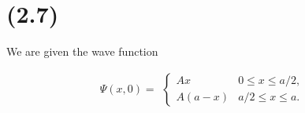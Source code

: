 \section{(2.7)}

We are given the wave function

\begin{equation}
    \Psi(x,0) = 
        \begin{alignedat}{1}
        \begin{cases}
            Ax \qquad & 0 \leq x \leq a/2, \\
            A(a-x) & a/2 \leq x \leq a.
        \end{cases}
        \end{alignedat}\label{eq:Prblm2WaveFunction}
\end{equation}


